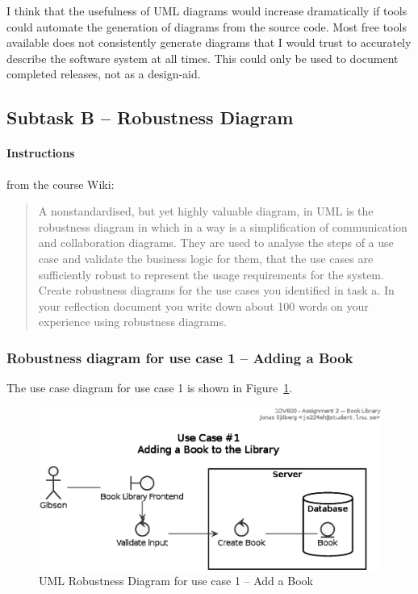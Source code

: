 I think that the usefulness of UML diagrams would increase dramatically if
tools could automate the generation of diagrams from the source code.  Most
free tools available does not consistently generate diagrams that I would trust
to accurately describe the software system at all times. This could only be
used to document completed releases, not as a design-aid.


\subsection{Subtask B -- Robustness Diagram}\label{task-1b}
\paragraph{Instructions}\label{task-1b-instructions}
from the course Wiki\cite{1dv600:lab2:instructions}:

\begin{quote}
  A non­standardised, but yet highly valuable diagram, in UML is the robustness
  diagram in which in a way is a simplification of communication and
  collaboration diagrams. They are used to analyse the steps of a use case and
  validate the business logic for them, that the use cases are sufficiently
  robust to represent the usage requirements for the system.  Create robustness
  diagrams for the use cases you identified in task a. In your reflection
  document you write down about 100 words on your experience using robustness
  diagrams.
\end{quote}


\subsubsection{Robustness diagram for use case 1 -- Adding a Book}\label{task-1b-robust1}
The use case diagram for use case 1 is shown in Figure~\ref{fig:uml-usecase1rob}.

\begin{figure}[htbp]
  \centering
  \includegraphics[width=0.75\linewidth]{include/uml-use-case-1-rob.eps}
  \caption{UML Robustness Diagram for use case 1 -- Add a Book}
  \label{fig:uml-usecase1rob}
\end{figure}



